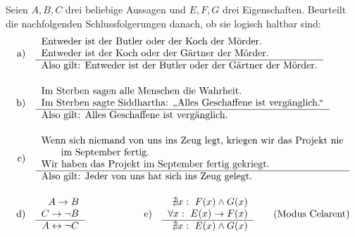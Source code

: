 \begin{aufg}
    Seien $A,B,C$ drei beliebige Aussagen und $E,F,G$ drei Eigenschaften. Beurteilt die nachfolgenden Schlussfolgerungen danach, ob sie logisch haltbar sind:
    \begin{align*}
        \text{a)}\quad &\begin{tabular}{l}
            Entweder ist der Butler oder der Koch der Mörder. \\
            Entweder ist der Koch oder der Gärtner der Mörder. \\ \hline
            Also gilt: Entweder ist der Butler oder der Gärtner der Mörder.
        \end{tabular} \\[1em]
        \text{b)}\quad &\begin{tabular}{l}
            Im Sterben sagen alle Menschen die Wahrheit. \\
            Im Sterben sagte Siddhartha: „Alles Geschaffene ist vergänglich.“ \\ \hline
            Also gilt: Alles Geschaffene ist vergänglich.
        \end{tabular} \\[1em]
        \text{c)}\quad &\begin{tabular}{l}
            Wenn sich niemand von uns ins Zeug legt, kriegen wir das Projekt nie \\
            \qquad im September fertig. \\
            Wir haben das Projekt im September fertig gekriegt. \\ \hline
            Also gilt: Jeder von uns hat sich ins Zeug gelegt.
        \end{tabular} \\[1em]
        \text{d)}\quad &\begin{tabular}{r}
            $A\to B$ \\
            $C\to \neg B$ \\ \hline
            $A\leftrightarrow \neg C$
        \end{tabular} \qquad\qquad\qquad \text{e)}\quad \begin{tabular}{r}
            $\nexists x:\ F(x)\land G(x)$ \\
            $\forall x:\ E(x)\to F(x)$ \\ \hline
            $\nexists x:\ E(x)\land G(x)$
        \end{tabular} \qquad (\text{Modus Celarent})
    \end{align*}
\end{aufg}




